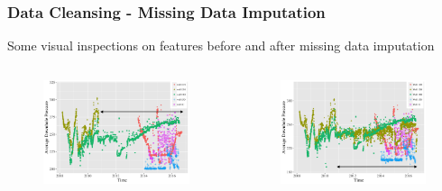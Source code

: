 \documentclass[xcolor=table]{beamer}
\begin{document}
\begin{frame}
\frametitle{Data Cleansing - Missing Data Imputation}
\begin{block}{}
Some visual inspections on features before and after missing data imputation
\end{block}

\begin{columns}[c]
\begin{figure}
\includegraphics[width=1\linewidth,left]{adp_t_copy.png} 
\end{figure}

\begin{figure}
\includegraphics[width=1\linewidth, right]{pre_adp_t.png}
\end{figure}
\end{columns}

\end{frame}
\end{document}
